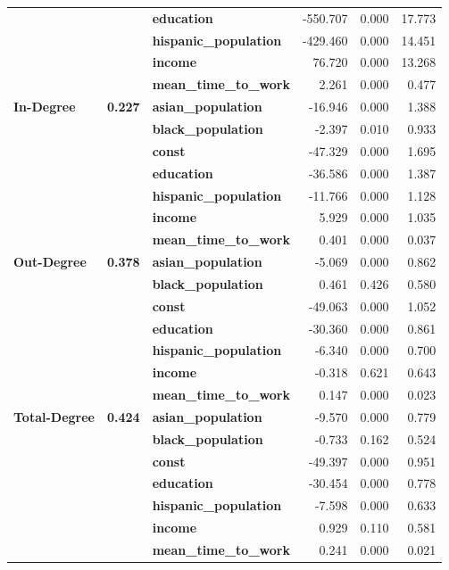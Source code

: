 \begin{tabular}{lllrrr}
             &       & \textbf{education} & -550.707 &    0.000 &   17.773 \\
             &       & \textbf{hispanic\_population} & -429.460 &    0.000 &   14.451 \\
             &       & \textbf{income} &   76.720 &    0.000 &   13.268 \\
             &       & \textbf{mean\_time\_to\_work} &    2.261 &    0.000 &    0.477 \\
\cline{1-6}
\cline{2-6}
\multirow{7}{*}{\textbf{In-Degree}} & \multirow{7}{*}{\textbf{0.227}} & \textbf{asian\_population} &  -16.946 &    0.000 &    1.388 \\
             &       & \textbf{black\_population} &   -2.397 &    0.010 &    0.933 \\
             &       & \textbf{const} &  -47.329 &    0.000 &    1.695 \\
             &       & \textbf{education} &  -36.586 &    0.000 &    1.387 \\
             &       & \textbf{hispanic\_population} &  -11.766 &    0.000 &    1.128 \\
             &       & \textbf{income} &    5.929 &    0.000 &    1.035 \\
             &       & \textbf{mean\_time\_to\_work} &    0.401 &    0.000 &    0.037 \\
\cline{1-6}
\cline{2-6}
\multirow{7}{*}{\textbf{Out-Degree}} & \multirow{7}{*}{\textbf{0.378}} & \textbf{asian\_population} &   -5.069 &    0.000 &    0.862 \\
             &       & \textbf{black\_population} &    0.461 &    0.426 &    0.580 \\
             &       & \textbf{const} &  -49.063 &    0.000 &    1.052 \\
             &       & \textbf{education} &  -30.360 &    0.000 &    0.861 \\
             &       & \textbf{hispanic\_population} &   -6.340 &    0.000 &    0.700 \\
             &       & \textbf{income} &   -0.318 &    0.621 &    0.643 \\
             &       & \textbf{mean\_time\_to\_work} &    0.147 &    0.000 &    0.023 \\
\cline{1-6}
\cline{2-6}
\multirow{7}{*}{\textbf{Total-Degree}} & \multirow{7}{*}{\textbf{0.424}} & \textbf{asian\_population} &   -9.570 &    0.000 &    0.779 \\
             &       & \textbf{black\_population} &   -0.733 &    0.162 &    0.524 \\
             &       & \textbf{const} &  -49.397 &    0.000 &    0.951 \\
             &       & \textbf{education} &  -30.454 &    0.000 &    0.778 \\
             &       & \textbf{hispanic\_population} &   -7.598 &    0.000 &    0.633 \\
             &       & \textbf{income} &    0.929 &    0.110 &    0.581 \\
             &       & \textbf{mean\_time\_to\_work} &    0.241 &    0.000 &    0.021 \\
\bottomrule
\end{tabular}
